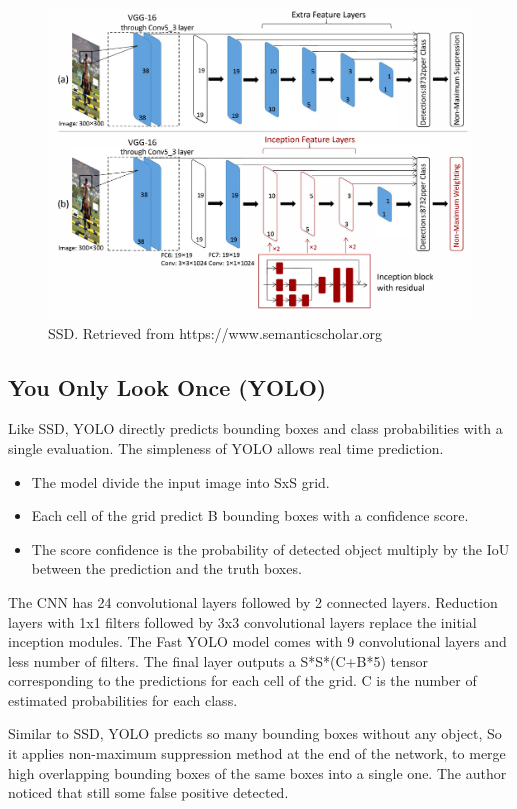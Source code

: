 \documentclass[12pt]{report}
\begin{document}
\begin{figure}[h]
    \centering
    \includegraphics[width=.7\textwidth]{./images/ssd.png}
    \caption{SSD. Retrieved from https://www.semanticscholar.org}
    \label{fig:frcnn}
\end{figure} 



\subsection{You Only Look Once (YOLO)}

Like SSD, YOLO directly predicts bounding boxes and class probabilities
with a single evaluation. The simpleness of YOLO allows real time prediction.
\begin{itemize}
    \item The model divide the input image into SxS grid.
    \item Each cell of the grid predict B bounding boxes with a confidence score.
    \item The score confidence is the probability of detected object multiply by the IoU between the prediction and the truth boxes.
\end{itemize}
The CNN has 24 convolutional layers followed by 2 connected layers.
Reduction layers with 1x1 filters followed by 3x3 convolutional layers 
replace the initial inception modules.
\bigbreak
The Fast YOLO model comes with 9  convolutional layers and less number of filters.
The final layer outputs a S*S*(C+B*5) tensor corresponding to the predictions for each cell of the grid.
C is the number of estimated probabilities for each class.

Similar to SSD, YOLO predicts so many bounding boxes without any object,
So it applies non-maximum suppression method at the end of the network,
to merge high overlapping bounding boxes of the same boxes into a single one.
The author noticed that still some false positive detected.\cite{Redmon2016}
\end{document}
